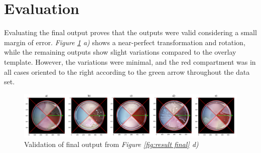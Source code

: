 \section{Evaluation}
Evaluating the final output proves that the outputs were valid considering a small margin of error. \textit{Figure \ref{fig:result evaluation} a)} shows a near-perfect transformation and rotation, while the remaining outputs show slight variations compared to the overlay template. However, the variations were minimal, and the red compartment was in all cases oriented to the right according to the green arrow throughout the data set. 
\begin{figure}[H]
      \centering
      \includegraphics[width=1\linewidth]{figures/PDF/Evaluation_result.pdf}
    \caption{Validation of final output from \textit{Figure \ref{fig:result final} d)}}
    \label{fig:result evaluation}
\end{figure}






